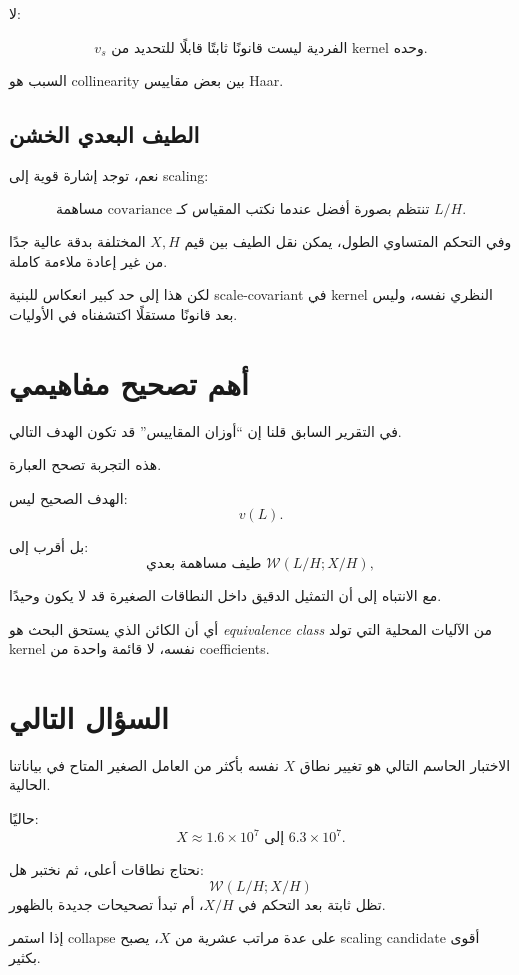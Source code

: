 \documentclass[12pt]{article}
\begin{document}
لا:

\[
\boxed{
v_s\text{ الفردية ليست قانونًا ثابتًا قابلًا للتحديد من kernel وحده.}
}
\]

السبب هو collinearity بين بعض مقاييس Haar.

\subsection{الطيف البعدي الخشن}

نعم، توجد إشارة قوية إلى scaling:

\[
\boxed{
\text{مساهمة covariance تنتظم بصورة أفضل عندما نكتب المقياس كـ }L/H.
}
\]

وفي التحكم المتساوي الطول، يمكن نقل الطيف بين قيم \(X,H\) المختلفة
بدقة عالية جدًا من غير إعادة ملاءمة كاملة.

لكن هذا إلى حد كبير انعكاس للبنية scale-covariant في kernel النظري نفسه،
وليس بعد قانونًا مستقلًا اكتشفناه في الأوليات.

\section{أهم تصحيح مفاهيمي}

في التقرير السابق قلنا إن ``أوزان المقاييس'' قد تكون الهدف التالي.

هذه التجربة تصحح العبارة.

الهدف الصحيح ليس:
\[
v(L).
\]

بل أقرب إلى:
\[
\boxed{
\text{طيف مساهمة بعدي }
\mathcal W(L/H;X/H),
}
\]

مع الانتباه إلى أن التمثيل الدقيق داخل النطاقات الصغيرة قد لا يكون وحيدًا.

أي أن الكائن الذي يستحق البحث هو \emph{equivalence class} من الآليات
المحلية التي تولد kernel نفسه، لا قائمة واحدة من coefficients.

\section{السؤال التالي}

الاختبار الحاسم التالي هو تغيير نطاق \(X\) نفسه بأكثر من العامل الصغير
المتاح في بياناتنا الحالية.

حاليًا:
\[
X\approx 1.6\times10^7
\text{ إلى }
6.3\times10^7.
\]

نحتاج نطاقات أعلى، ثم نختبر هل:
\[
\mathcal W(L/H;X/H)
\]
تظل ثابتة بعد التحكم في \(X/H\)، أم تبدأ تصحيحات جديدة بالظهور.

إذا استمر collapse على عدة مراتب عشرية من \(X\)، يصبح scaling candidate
أقوى بكثير.
\end{document}
